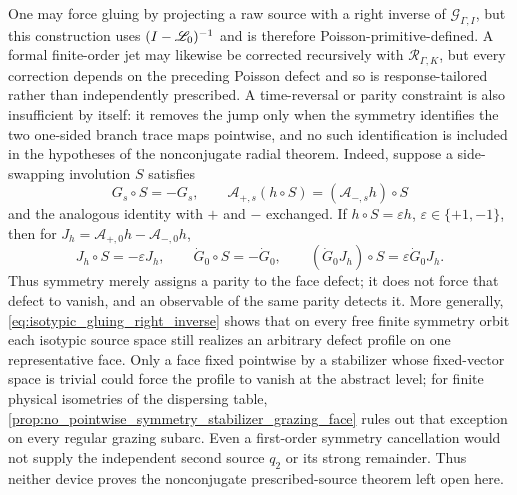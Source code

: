 \begin{remark*}
One may force gluing by projecting a raw source with a right inverse of
\(\mathcal G_{\Gamma,I}\), but this construction uses
\((I-\mathscr L_0)^{-1}\) and is therefore Poisson-primitive-defined.  A
formal finite-order jet may likewise be corrected recursively with
\(\mathcal R_{\Gamma,K}\), but every correction depends on the preceding
Poisson defect and so is response-tailored rather than independently
prescribed.  A
time-reversal or parity constraint is also insufficient by itself: it removes
the jump only when the symmetry identifies the two one-sided branch trace maps
pointwise, and no such identification is included in the hypotheses of the
nonconjugate radial theorem.
Indeed, suppose a side-swapping involution \(S\) satisfies
\[
 G_s\circ S=-G_s,\qquad
 \mathcal A_{+,s}(h\circ S)
   =(\mathcal A_{-,s}h)\circ S
\]
and the analogous identity with \(+\) and \(-\) exchanged.  If
\(h\circ S=\varepsilon h\), \(\varepsilon\in\{+1,-1\}\), then for
\(J_h=\mathcal A_{+,0}h-\mathcal A_{-,0}h\),
\[
 J_h\circ S=-\varepsilon J_h,\qquad
 \dot G_0\circ S=-\dot G_0,\qquad
 (\dot G_0J_h)\circ S=\varepsilon\dot G_0J_h.
\]
Thus symmetry merely assigns a parity to the face defect; it does not force
that defect to vanish, and an observable of the same parity detects it.
More generally, \eqref{eq:isotypic_gluing_right_inverse} shows that on every
free finite symmetry orbit each isotypic source space still realizes an
arbitrary defect profile on one representative face.  Only a face fixed
pointwise by a stabilizer whose fixed-vector space is trivial could force
the profile to vanish at the abstract level; for finite physical isometries of
the dispersing table,
\cref{prop:no_pointwise_symmetry_stabilizer_grazing_face} rules out that
exception on every regular grazing subarc.
Even a first-order symmetry cancellation would not supply the independent
second source \(q_2\) or its strong remainder.  Thus neither device proves the
nonconjugate prescribed-source theorem left open here.
\end{remark*}
